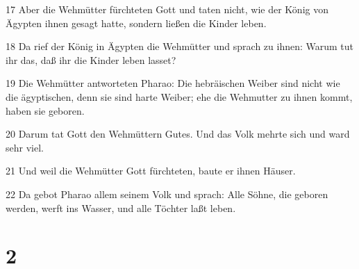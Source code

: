 \par 17 Aber die Wehmütter fürchteten Gott und taten nicht, wie der König von Ägypten ihnen gesagt hatte, sondern ließen die Kinder leben.
\par 18 Da rief der König in Ägypten die Wehmütter und sprach zu ihnen: Warum tut ihr das, daß ihr die Kinder leben lasset?
\par 19 Die Wehmütter antworteten Pharao: Die hebräischen Weiber sind nicht wie die ägyptischen, denn sie sind harte Weiber; ehe die Wehmutter zu ihnen kommt, haben sie geboren.
\par 20 Darum tat Gott den Wehmüttern Gutes. Und das Volk mehrte sich und ward sehr viel.
\par 21 Und weil die Wehmütter Gott fürchteten, baute er ihnen Häuser.
\par 22 Da gebot Pharao allem seinem Volk und sprach: Alle Söhne, die geboren werden, werft ins Wasser, und alle Töchter laßt leben.

\chapter{2}


